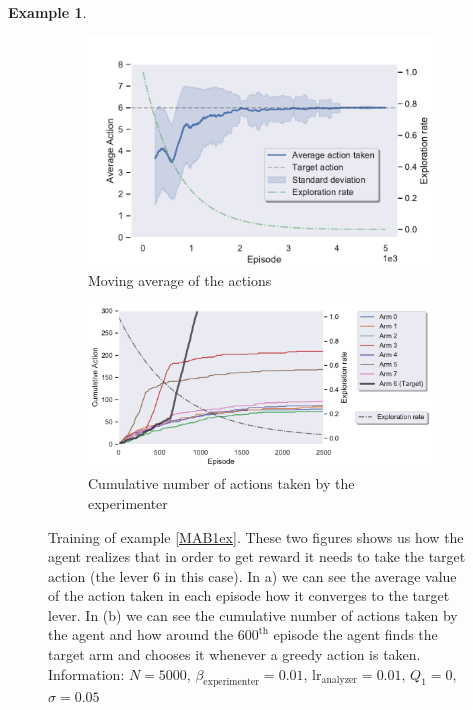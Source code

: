 \documentclass[11pt,a4paper,twoside]{report}
\newcommand{\+}{\textnormal{+} }
\theoremstyle{definition}
\newtheorem{myex}[mythm]{Example}
\numberwithin{equation}{chapter}
\begin{document}
\begin{myex}
    \begin{figure}[]
      \centering
      \begin{subfigure}{.5\textwidth}
        \centering
        \includegraphics[width=1\linewidth]{figures/Actions-MAB1.pdf}
        \caption{Moving average of the actions}
        \label{fig:ActionAverageMAB1}
      \end{subfigure}%
      \begin{subfigure}{.5\textwidth}
        \centering
        \includegraphics[width=1\linewidth]{figures/Cum-action-MAB1.pdf}
        \caption{Cumulative number of actions taken by the experimenter}
        \label{fig:actionsMAB1}
      \end{subfigure}
      \caption{Training of example \ref{MAB1ex}. These two figures shows us how
      the agent realizes that in order to get reward it needs to take the target
      action (the lever 6 in this case). In a) we can see the average value of
      the action taken in each episode how it converges to the target lever.
      In (b) we can see the cumulative number of actions taken by the agent and
      how around the $600^\text{th}$ episode the agent finds the target arm and
      chooses it whenever a greedy action is taken. Information: $N=5000$,
      $\beta_\text{experimenter}=0.01$, $\text{lr}_\text{analyzer}=0.01$,
      $Q_1=0$, $\sigma=0.05$}
    \end{figure}  




\end{myex}
\end{document}
